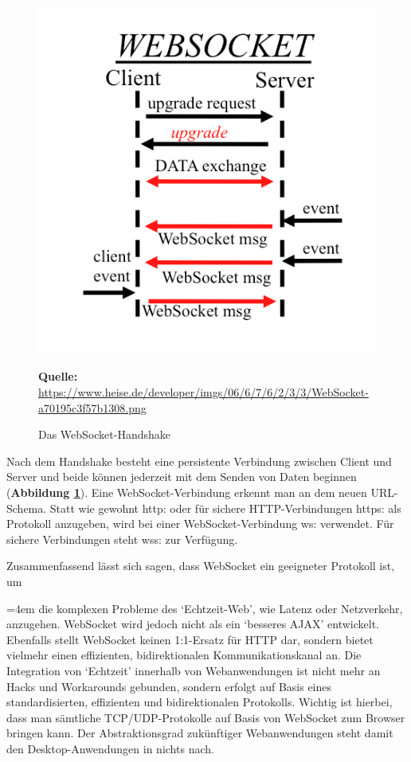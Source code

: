 \begin{figure}[H]
  \begin{center}
    \includegraphics[scale=0.4]{img/webSocketHandshake}
	\caption{Das WebSocket-Handshake}
	\footnotesize\sffamily\textbf{Quelle:} \url{https://www.heise.de/developer/imgs/06/6/7/6/2/3/3/WebSocket-a70195c3f57b1308.png} 
	\label{fig:webSocketHandshake}
  \end{center}   
\end{figure}

Nach dem Handshake besteht eine persistente Verbindung zwischen Client und Server und beide können jederzeit mit dem Senden von Daten beginnen (\textbf{Abbildung \ref{fig:webSocketHandshake}}). Eine WebSocket-Verbindung erkennt man an dem neuen URL-Schema. Statt wie gewohnt \glqq http:\grqq{} oder für sichere HTTP-Verbindungen \glqq https:\grqq{} als Protokoll anzugeben, wird bei einer WebSocket-Verbindung \glqq ws:\grqq{} verwendet. Für sichere Verbindungen steht \glqq wss:\grqq{} zur Verfügung.\bigskip

Zusammenfassend lässt sich sagen, dass WebSocket ein geeigneter Protokoll ist, um \bigskip

\par
\begingroup
\leftskip=4em %
\rightskip\leftskip
\noindent \glqq [...] die komplexen Probleme des ‘Echtzeit-Web’, wie Latenz oder Netzverkehr, anzugehen. WebSocket wird jedoch nicht als ein ‘besseres AJAX’ entwickelt. Ebenfalls stellt WebSocket keinen 1:1-Ersatz für HTTP dar, sondern bietet vielmehr einen effizienten, bidirektionalen Kommunikationskanal an. Die Integration von ‘Echtzeit’ innerhalb von Webanwendungen ist nicht mehr an Hacks und Workarounds gebunden, sondern erfolgt auf Basis eines standardisierten, effizienten und bidirektionalen Protokolls. Wichtig ist hierbei, dass man sämtliche TCP/UDP-Protokolle auf Basis von WebSocket zum Browser bringen kann. Der Abstraktionsgrad zukünftiger Webanwendungen steht damit den Desktop-Anwendungen in nichts nach.\grqq{} \cite{Matt2011}
\par
\endgroup

